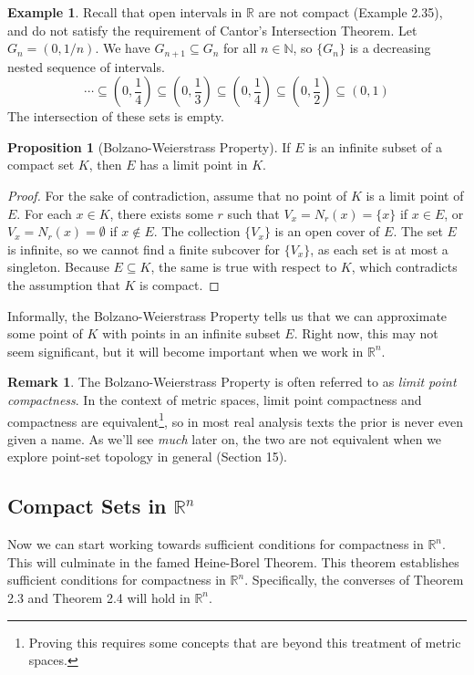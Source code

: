 \documentclass{article}
\newcommand{\N}{\mathbb{N}}
\newcommand{\R}{\mathbb{R}}
\theoremstyle{definition}
\newtheorem{proposition}{Proposition}[section]
\newtheorem{example}{Example}[section]
\newtheorem{remark}{Remark}[section]
\begin{document}
	\begin{example}
		Recall that open intervals in $ \R $ are not compact (Example 2.35), and do not satisfy the requirement of Cantor's Intersection Theorem. Let $ G_{n}=(0,1/n) $. We have $ G_{n+1}\subseteq G_{n} $ for all $ n\in\N $, so $ \{G_n\} $ is a decreasing nested sequence of intervals. $$ \cdots\subseteq \left(0,\frac{1}{4}\right)\subseteq\left(0,\frac{1}{3}\right)\subseteq\left(0,\frac{1}{4}\right)\subseteq\left(0,\frac{1}{2}\right)\subseteq(0,1)$$  
		The intersection of these sets is empty.	
	\end{example}
	\begin{proposition}[Bolzano-Weierstrass Property]
		If $ E $ is an infinite subset of a compact set $ K $, then $ E $ has a limit point in $ K $. 
	\end{proposition}
	\begin{proof}
		For the sake of contradiction, assume that no point of $ K $ is a limit point of $ E $. For each $ x\in K $, there exists some $ r $ such that $ V_x=N_r(x)=\{x\}  $ if $ x\in E $, or $ V_x=N_r(x)=\emptyset $ if $ x\notin E $. The collection $ \{V_x\} $ is an open cover of $ E $. The set $ E $ is infinite, so we cannot find a finite subcover for $ \{V_x\} $, as each set is at most a singleton. Because $ E\subseteq K $, the same is true with respect to $ K $, which contradicts the assumption that $ K $ is compact. 
	\end{proof}
	Informally, the Bolzano-Weierstrass Property tells us that we can approximate some point of $ K $ with points in an infinite subset $ E $. Right now, this may not seem significant, but it will become important when we work in $ \R^n $. 
	\begin{remark}
		The Bolzano-Weierstrass Property is often referred to as \textit{\color{red}limit point compactness}. In the context of metric spaces, limit point compactness and compactness are equivalent\footnote{Proving this requires some concepts that are beyond this treatment of metric spaces.}, so in most real analysis texts the prior is never even given a name. As we'll see \textit{much} later on, the two are not equivalent when we explore point-set topology in general (Section 15).   
	\end{remark} 
	\subsection{Compact Sets in $ \R^n $}
	Now we can start working towards sufficient conditions for compactness in $ \R^n $. This will culminate in the famed Heine-Borel Theorem. This theorem establishes sufficient conditions for compactness in $ \R^n $. Specifically, the converses of Theorem 2.3 and Theorem 2.4 will hold in $ \R^n $.  
	
\end{document}
